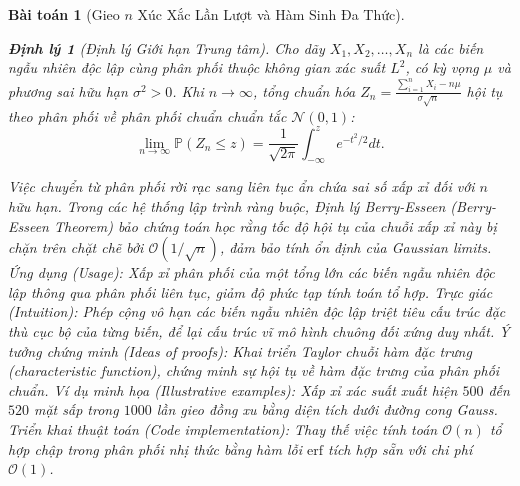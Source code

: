 \documentclass{article}
\newtheorem{baitoan}{Bài toán}
\newtheorem{dinhly}{Định lý}
\begin{document}
\begin{baitoan}[Gieo $n$ Xúc Xắc Lần Lượt và Hàm Sinh Đa Thức]
\begin{dinhly}[Định lý Giới hạn Trung tâm]
Cho dãy $X_1, X_2, \dots, X_n$ là các biến ngẫu nhiên độc lập cùng phân phối thuộc không gian xác suất $L^2$, có kỳ vọng $\mu$ và phương sai hữu hạn $\sigma^2 > 0$. Khi $n \to \infty$, tổng chuẩn hóa $Z_n = \frac{\sum_{i=1}^n X_i - n\mu}{\sigma \sqrt{n}}$ hội tụ theo phân phối về phân phối chuẩn chuẩn tắc $\mathcal{N}(0,1)$:
$$ \lim_{n \to \infty} \mathbb{P}(Z_n \le z) = \frac{1}{\sqrt{2\pi}} \int_{-\infty}^z e^{-t^2/2} dt. $$
\end{dinhly}
Việc chuyển từ phân phối rời rạc sang liên tục ẩn chứa sai số xấp xỉ đối với $n$ hữu hạn. Trong các hệ thống lập trình ràng buộc, \textit{Định lý Berry-Esseen (Berry-Esseen Theorem)} bảo chứng toán học rằng tốc độ hội tụ của chuỗi xấp xỉ này bị chặn trên chặt chẽ bởi $\mathcal{O}(1/\sqrt{n})$, đảm bảo tính ổn định của Gaussian limits.
\emph{Ứng dụng (Usage):} Xấp xỉ phân phối của một tổng lớn các biến ngẫu nhiên độc lập thông qua phân phối liên tục, giảm độ phức tạp tính toán tổ hợp.
\emph{Trực giác (Intuition):} Phép cộng vô hạn các biến ngẫu nhiên độc lập triệt tiêu cấu trúc đặc thù cục bộ của từng biến, để lại cấu trúc vĩ mô hình chuông đối xứng duy nhất.
\emph{Ý tưởng chứng minh (Ideas of proofs):} Khai triển Taylor chuỗi hàm đặc trưng (characteristic function), chứng minh sự hội tụ về hàm đặc trưng của phân phối chuẩn.
\emph{Ví dụ minh họa (Illustrative examples):} Xấp xỉ xác suất xuất hiện $500$ đến $520$ mặt sấp trong $1000$ lần gieo đồng xu bằng diện tích dưới đường cong Gauss.
\emph{Triển khai thuật toán (Code implementation):} Thay thế việc tính toán $\mathcal{O}(n)$ tổ hợp chập trong phân phối nhị thức bằng hàm lỗi $\mathrm{erf}$ tích hợp sẵn với chi phí $\mathcal{O}(1)$.

\end{baitoan}

\end{document}
